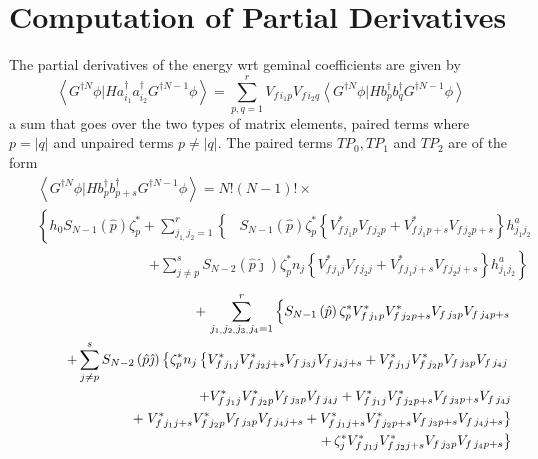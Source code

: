 \documentclass[aps,preprint]{revtex4}
\begin{document}
\section{Computation of Partial Derivatives}

The partial derivatives of the energy wrt geminal coefficients are given by 
\begin{equation}
\left\langle G^{\dagger N}\phi |Ha_{i_{1}}^{\dagger }a_{i_{2}}^{\dagger
}G^{\dagger N-1}\phi \right\rangle
=\sum_{p,q=1}^{r}V_{f\,i_{1}p}V_{f\,i_{2}q}\left\langle G^{\dagger N}\phi
|Hb_{p}^{\dagger }b_{q}^{\dagger }G^{\dagger N-1}\phi \right\rangle 
\end{equation}%
a sum that goes over the two types of matrix elements, paired terms where $%
p=\left| q\right| $ and unpaired terms $p\neq \left| q\right| $. The paired
terms $TP_{0},TP_{1}$ and $TP_{2}$ are of the form 
\begin{eqnarray*}
&&\left\langle G^{\dagger N}\phi |Hb_{p}^{\dagger }b_{p+s}^{\dagger
}G^{\dagger N-1}\phi \right\rangle =N!\left( N-1\right) !\times  \\
&&\left\{ h_{0}S_{N-1}\left( \hat{p}\right) \zeta _{p}^{\ast
}+\sum_{j_{1,}j_{2}=1}^{r}\left\{ 
\begin{array}{c}
\end{array}%
S_{N-1}\left( \hat{p}\right) \zeta _{p}^{\ast }\left\{ V_{f\,j_{1}p}^{\ast
}V_{f\,j_{2}p}+V_{f\,j_{1}p+s}^{\ast }V_{f\,j_{2}p+s}\right\}
h_{j_{1}j_{2}}^{a}\right. \right.  \\
&&\qquad \qquad \qquad \qquad \left. +\right. \left. \sum_{j\neq
p}^{s}S_{N-2}\left( \hat{p}\hat{\jmath}\right) \zeta _{p}^{\ast
}n_{j}\left\{ V_{f\,j_{1}j}^{\ast }V_{f\,j_{2}j}+V_{f\,j_{1}j+s}^{\ast
}V_{f\,j_{2}j+s}\right\} h_{j_{1}j_{2}}^{a}\right\} 
\end{eqnarray*}%
\begin{eqnarray*}
&&\left. +\right. \sum_{j_{1,}j_{2,}j_{3,}j_{4}=1}^{r}\left\{ \underset{}{%
\overset{}{}}S_{N-1}\left( \hat{p}\right) \zeta _{p}^{\ast
}V_{f\,j_{1}p}^{\ast }V_{f\,j_{2}p+s}^{\ast
}V_{f\,j_{3}p}V_{f\,j_{4}p+s}\right.  \\
&&\qquad +\sum_{j\neq p}^{s}S_{N-2}\left( \hat{p}\hat{\jmath}\right) \left\{
\zeta _{p}^{\ast }n_{j}\left\{ V_{f\,j_{1}j}^{\ast }V_{f\,j_{2}j+s}^{\ast
}V_{f\,j_{3}j}V_{f\,j_{4}j+s}+V_{f\,j_{1}j}^{\ast }V_{f\,j_{2}p}^{\ast
}V_{f\,j_{3}p}V_{f\,j_{4}j}\right. \right.  \\
&&\qquad \qquad \qquad \qquad +V_{f\,j_{1}j}^{\ast }V_{f\,j_{2}p}^{\ast
}V_{f\,j_{3}p}V_{f\,j_{4}j}+V_{f\,j_{1}j}^{\ast }V_{f\,j_{2}p+s}^{\ast
}V_{f\,j_{3}p+s}V_{f\,j_{4}j} \\
&&\qquad \qquad \qquad \qquad +\left. V_{f\,j_{1}j+s}^{\ast
}V_{f\,j_{2}p}^{\ast }V_{f\,j_{3}p}V_{f\,j_{4}j+s}+V_{f\,j_{1}j+s}^{\ast
}V_{f\,j_{2}p+s}^{\ast }V_{f\,j_{3}p+s}V_{f\,j_{4}j+s}\right\}  \\
&&\qquad \qquad \qquad \qquad \qquad \qquad \qquad \qquad \qquad \qquad
\left. +\,\zeta _{j}^{\ast }V_{f\,j_{1}j}^{\ast }V_{f\,j_{2}j+s}^{\ast
}V_{f\,j_{3}p}V_{f\,j_{4}p+s}\right\} 
\end{eqnarray*}%
\end{document}
